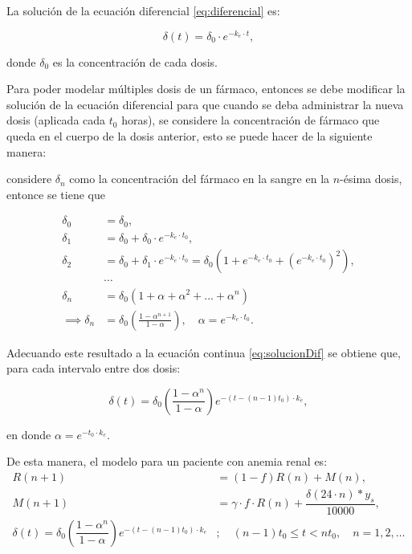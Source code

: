 La solución de la ecuación diferencial \ref{eq:diferencial} es:

\begin{equation}\label{eq:solucionDif}
    \delta(t)=\delta_0\cdot e^{-k_e\cdot t},
\end{equation}

donde $\delta_0$ es la concentración de cada dosis.

Para poder modelar múltiples dosis de un fármaco, entonces se debe modificar la solución de la ecuación diferencial para que cuando se deba administrar la nueva dosis (aplicada cada $t_0$ horas), se considere la concentración de fármaco que queda en el cuerpo de la dosis anterior, esto se puede hacer de la siguiente manera:

considere $\delta_n$ como la concentración del fármaco en la sangre en la $n$-ésima dosis, entonce se tiene que 

\begin{align*}
    \delta_0 &= \delta_0,\\
    \delta_1 &= \delta_0 + \delta_0\cdot e^{-k_e\cdot t_0}, \\
    \delta_2 &= \delta_0 + \delta_1\cdot e^{-k_e\cdot t_0}= \delta_0\left(1+e^{-k_e\cdot t_0}+\left(e^{-k_e\cdot t_0}\right)^2\right), \\
    &\cdots \\
    \delta_n &= \delta_0(1+\alpha+\alpha^2+...+\alpha^{n}) \\
    \implies \delta_n &= \delta_0\left(\frac{1-\alpha^{n+1}}{1-\alpha}\right),\quad \alpha=e^{-k_e\cdot t_0}.
\end{align*}

Adecuando este resultado a la ecuación continua \ref{eq:solucionDif} se obtiene que, para cada intervalo entre dos dosis:

\begin{equation*}
    \delta(t) = \delta_{0} \left(\dfrac{1-\alpha^{n}}{1 - \alpha}\right) e^{-(t- (n-1) t_{0})\cdot k_e},
\end{equation*}  

en donde $\alpha = e^{-t_0\cdot k_e}$.

De esta manera, el modelo para un paciente con anemia renal es:
\begin{align}\label{eq:ModeloAnemia}
    R(n+1) &=(1-f)R(n)+M(n), \\
    M(n+1) &=\gamma \cdot f\cdot R(n) + \dfrac{\delta(24\cdot n)*y_s}{10000}, \nonumber \\
    \delta(t) = \delta_{0} \left(\dfrac{1-\alpha^{n}}{1 - \alpha}\right) e^{-(t- (n-1) t_{0})\cdot k_e} &; \quad (n-1)t_{0} \leq t < n t_{0}, \quad n=1,2,\dots\nonumber
\end{align}


